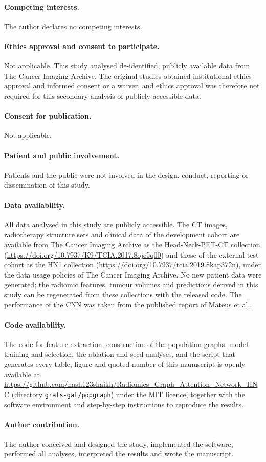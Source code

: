 \documentclass[11pt,a4paper]{article}
\begin{document}
\paragraph{Competing interests.}The author declares no competing interests.

\paragraph{Ethics approval and consent to participate.}Not applicable. This study analysed de-identified, publicly available data from The Cancer Imaging Archive. The original studies obtained institutional ethics approval and informed consent or a waiver, and ethics approval was therefore not required for this secondary analysis of publicly accessible data.

\paragraph{Consent for publication.}Not applicable.

\paragraph{Patient and public involvement.}Patients and the public were not involved in the design, conduct, reporting or dissemination of this study.

\paragraph{Data availability.}All data analysed in this study are publicly accessible. The CT images, radiotherapy structure sets and clinical data of the development cohort are available from The Cancer Imaging Archive as the Head-Neck-PET-CT collection (\url{https://doi.org/10.7937/K9/TCIA.2017.8oje5q00}) and those of the external test cohort as the HN1 collection (\url{https://doi.org/10.7937/tcia.2019.8kap372n}), under the data usage policies of The Cancer Imaging Archive. No new patient data were generated; the radiomic features, tumour volumes and predictions derived in this study can be regenerated from these collections with the released code. The performance of the CNN was taken from the published report of Mateus et al.\cite{mateus2023}.

\paragraph{Code availability.}The code for feature extraction, construction of the population graphs, model training and selection, the ablation and seed analyses, and the script that generates every table, figure and quoted number of this manuscript is openly available at \url{https://github.com/hash123shaikh/Radiomics_Graph_Attention_Network_HNC} (directory \texttt{grafs-gat/popgraph}) under the MIT licence, together with the software environment and step-by-step instructions to reproduce the results.

\paragraph{Author contribution.}The author conceived and designed the study, implemented the software, performed all analyses, interpreted the results and wrote the manuscript.


{\small\raggedright
}
\end{document}
